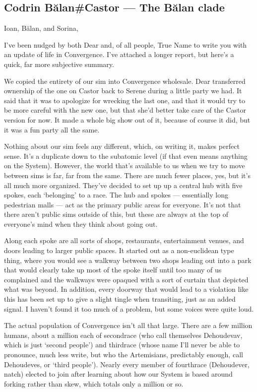 \hypertarget{codrin-bux103lancastor-the-bux103lan-clade}{%
\subsection{Codrin Bălan\#Castor — The Bălan clade}\label{codrin-bux103lancastor-the-bux103lan-clade}}

Ioan, Bălan, and Sorina,

I've been nudged by both Dear and, of all people, True Name to write you with an update of life in Convergence. I've attached a longer report, but here's a quick, far more subjective summary.

We copied the entirety of our sim into Convergence wholesale. Dear transferred ownership of the one on Castor back to Serene during a little party we had. It said that it was to apologize for wrecking the last one, and that it would try to be more careful with the new one, but that she'd better take care of the Castor version for now. It made a whole big show out of it, because of course it did, but it was a fun party all the same.

Nothing about our sim feels any different, which, on writing it, makes perfect sense. It's a duplicate down to the subatomic level (if that even means anything on the System). However, the world that's available to us when we try to move between sims is far, far from the same. There are much fewer places, yes, but it's all much more organized. They've decided to set up up a central hub with five spokes, each `belonging' to a race. The hub and spokes — essentially long pedestrian malls — act as the primary public areas for everyone. It's not that there aren't public sims outside of this, but these are always at the top of everyone's mind when they think about going out.

Along each spoke are all sorts of shops, restaurants, entertainment venues, and doors leading to larger public spaces. It started out as a non-euclidean type thing, where you would see a walkway between two shops leading out into a park that would clearly take up most of the spoke itself until too many of us complained and the walkways were opaqued with a sort of curtain that depicted what was beyond. In addition, every doorway that would lead to a violation like this has been set up to give a slight tingle when transiting, just as an added signal. I haven't found it too much of a problem, but some voices were quite loud.

The actual population of Convergence isn't all that large. There are a few million humans, about a million each of secondrace (who call themselves Dehoudevav, which is just `second people') and thirdrace (whose name I'll never be able to pronounce, much less write, but who the Artemisians, predictably enough, call Dehoudeves, or `third people'). Nearly every member of fourthrace (Dehoudever, natch) elected to join after learning about how our System is based around forking rather than skew, which totals only a million or so.

